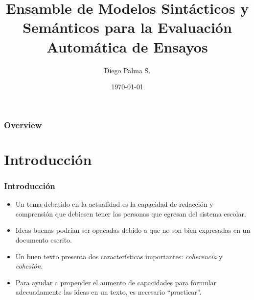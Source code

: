 \documentclass{beamer}
\title[Seminario de Investigación]{Ensamble de Modelos Sintácticos y Semánticos para la Evaluación Automática de Ensayos} %
\author{Diego Palma S.} %
\institute[UDEC] %
{
Universidad de Concepción \\ %
\medskip
\textit{dipalma@udec.cl} %
}
\date{\today} %
\begin{document}
\begin{frame}
\titlepage %
\end{frame}

\begin{frame}
\frametitle{Overview} %
\tableofcontents %
\end{frame}


\section{Introducción} %
\begin{frame}
\frametitle{Introducción}
\begin{itemize}
\item Un tema debatido en la actualidad es la capacidad de redacción y comprensión que debiesen tener las personas que egresan del sistema escolar.
\item Ideas buenas podrían ser opacadas debido a que no son bien expresadas en un documento escrito.
\item Un buen texto presenta dos características importantes: {\em coherencia} y {\em cohesión}.
\item Para ayudar a propender el aumento de capacidades para formular adecuadamente las ideas en un texto, es necesario ``practicar''.
\end{itemize}
\end{frame}
\end{document}
